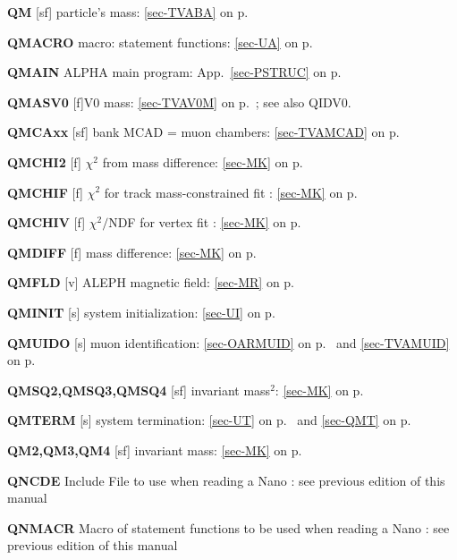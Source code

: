  \item{\bf QM      }[sf] particle's mass: \ref{sec-TVABA} on p.~\pageref{sec-TVABA}\\
 \item{\bf QMACRO  }macro: statement functions: \ref{sec-UA} on p.~\pageref{sec-UA}\\
 \item{\bf QMAIN   }ALPHA main program: App.~\ref{sec-PSTRUC} on p.~\pageref{sec-PSTRUC}\\
 \item{\bf QMASV0  }[f]V0 mass: \ref{sec-TVAV0M} on p.~\pageref{sec-TVAV0M}; see also QIDV0.\\
 \item{\bf QMCAxx  }[sf] bank MCAD = muon chambers: \ref{sec-TVAMCAD} on p.~\pageref{sec-TVAMCAD}\\
 \item{\bf QMCHI2 }[f] $\chi^2$ from mass difference: \ref{sec-MK} on
 p.~\pageref{sec-MK}\\
 \item{\bf QMCHIF }[f] $\chi^2$ for track mass-constrained fit : \ref{sec-MK} on
 p.~\pageref{sec-MK}\\
 \item{\bf QMCHIV }[f] $\chi^2/$NDF for vertex fit : \ref{sec-MK} on
 p.~\pageref{sec-MK}\\
 \item{\bf QMDIFF }[f] mass difference: \ref{sec-MK} on
 p.~\pageref{sec-MK}\\
 \item{\bf QMFLD   }[v] ALEPH magnetic field: \ref{sec-MR} on p.~\pageref{sec-MR}\\
 \item{\bf QMINIT  }[s] system initialization: \ref{sec-UI} on p.~\pageref{sec-UI}\\
 \item{\bf QMUIDO }[s] muon identification: \ref{sec-OARMUID} on p.~\pageref{sec-OARMUID} and
 \ref{sec-TVAMUID} on p.~\pageref{sec-TVAMUID}\\
 \item{\bf QMSQ2,QMSQ3,QMSQ4 }[sf] invariant mass$^2$: \ref{sec-MK} on p.~\pageref{sec-MK}\\
 \item{\bf QMTERM  }[s] system termination:
 \ref{sec-UT} on p.~\pageref{sec-UT} and \ref{sec-QMT} on p.~\pageref{sec-QMT}\\
 \item{\bf QM2,QM3,QM4 }[sf] invariant mass: \ref{sec-MK} on p.~\pageref{sec-MK}\\
 \item{\bf QNCDE   }Include File to use when reading a Nano :
      see previous edition of this manual\\
 \item{\bf QNMACR  }Macro of statement functions to be used when reading a Nano :
      see previous edition of this manual
 
